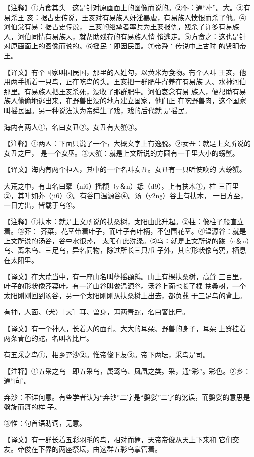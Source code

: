 \documentclass[a4paper,12pt,UTF8,twoside]{ctexbook}
\begin{document}
【注释】①方食其头：这是针对原画面上的图像而说的。②仆：通“朴”。大。③有易杀王 亥：据古史传说，王亥对有易族人奸淫暴虐，有易族人愤恨而杀了他。④河伯念有易：据古史传说， 王亥的继承者率兵为王亥报仇，残杀了许多有易族人，河伯同情有易族人，就帮助残存的有易族人悄 悄逃走。⑤方食之：这也是针对原画面上的图像而说的。⑥摇民：即因民国。⑦帝舜：传说中上古时 的贤明帝王。

【译文】有个国家叫因民国，那里的人姓勾，以黄米为食物。有个人叫 王亥，他用两手抓着一只鸟，正在吃鸟的头。王亥把一群肥牛寄养在有易族 人、水神河伯那里。有易族人把王亥杀死，没收了那群肥牛。河伯哀念有易 族人，便帮助有易族人偷偷地逃出来，在野兽出没的地方建立国家，他们正 在吃野兽肉，这个国家叫摇民国。另一种说法认为帝舜生了戏，戏的后代就 是摇民。

海内有两人①，名曰女丑②。女丑有大蟹③。

【注释】①两人：下面只说了一个，大概文字上有逸脱。②女丑：就是上文所说的女丑之尸， 是一个女巫。③大蟹：就是上文所说的方圆有一千里大小的螃蟹。

【译文】海内有两个神人，其中的一个名叫女丑。女丑有一只听使唤的 大螃蟹。

大荒之中，有山名曰孽（ni6）摇頵（y＆n）羝（d9）。上有扶木①，柱 三百里②，其叶如芥（ji6）③。有谷曰温源谷④。汤（y2ng）谷上有扶木， 一日方至，一日方出，皆载于乌⑤。

【注释】①扶木：就是上文所说的扶桑树，太阳由此升起。②柱：像柱子般直立着。③芥： 芥菜，花茎带着叶子，而叶子有叶柄，不包围花茎。④温源谷：就是上文所说的汤谷，谷中水很热， 太阳在此洗澡。⑤乌：就是上文所说的踆（c＆n）乌、离朱鸟、三足乌，异名同物，除过所长三只爪 子外，其它形状像乌鸦，栖息在太阳里。

【译文】在大荒当中，有一座山名叫孽摇頵羝。山上有棵扶桑树，高耸 三百里，叶子的形状像芥菜叶。有一道山谷叫做温源谷。汤谷上面也长了棵 扶桑树，一个太阳刚刚回到汤谷，另一个太阳刚刚从扶桑树上出去，都负载 于三足乌的背上。

有神，人面、（犬）［大］耳、兽身，珥两青蛇，名曰奢比尸。

【译文】有一个神人，长着人的面孔、大大的耳朵、野兽的身子，耳朵 上穿挂着两条青色的蛇，名叫奢比尸。

有五采之鸟①，相乡弃沙②。惟帝俊下友③。帝下两坛，采鸟是司。

【注释】①五采之鸟：即五采鸟，属鸾鸟、凤凰之类。采，通“彩”。彩色。②乡：通“向”。

弃沙：不详何意。有些学者认为“弃沙”二字是“媻娑”二字的讹误，而媻娑的意思是盤旋而舞的样 子。

③惟：句首语助词，无意。

【译文】有一群长着五彩羽毛的鸟，相对而舞，天帝帝俊从天上下来和 它们交友。帝俊在下界的两座祭坛，由这群五彩鸟掌管着。
\end{document}
